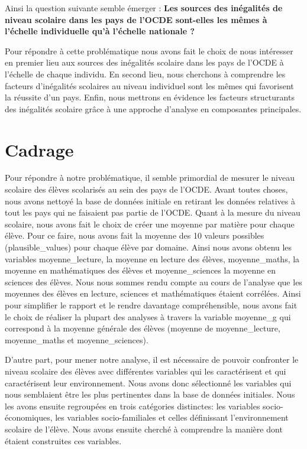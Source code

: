 \documentclass[
  french,
  11pt,
  a4paper,
]{report}
\begin{document}
Ainsi la question suivante semble émerger : \textbf{Les sources des
inégalités de niveau scolaire dans les pays de l'OCDE sont-elles les
mêmes à l'échelle individuelle qu'à l'échelle nationale ?}

Pour répondre à cette problématique nous avons fait le choix de nous
intéresser en premier lieu aux sources des inégalités scolaire dans les
pays de l'OCDE à l'échelle de chaque individu. En second lieu, nous
cherchons à comprendre les facteurs d'inégalités scolaires au niveau
individuel sont les mêmes qui favorisent la réussite d'un pays. Enfin,
nous mettrons en évidence les facteurs structurants des inégalités
scolaire grâce à une approche d'analyse en composantes principales.

\chapter{Cadrage}\label{cadrage}

Pour répondre à notre problématique, il semble primordial de mesurer le
niveau scolaire des élèves scolarisés au sein des pays de l'OCDE. Avant
toutes choses, nous avons nettoyé la base de données initiale en
retirant les données relatives à tout les pays qui ne faisaient pas
partie de l'OCDE. Quant à la mesure du niveau scolaire, nous avons fait
le choix de créer une moyenne par matière pour chaque élève. Pour ce
faire, nous avons fait la moyenne des 10 valeurs possibles
(plausible\_values) pour chaque élève par domaine. Ainsi nous avons
obtenu les variables moyenne\_lecture, la moyenne en lecture des élèves,
moyenne\_maths, la moyenne en mathématiques des élèves et
moyenne\_sciences la moyenne en sciences des élèves. Nous nous sommes
rendu compte au cours de l'analyse que les moyennes des élèves en
lecture, sciences et mathématiques étaient corrélées. Ainsi pour
simplifier le rapport et le rendre davantage compréhensible, nous avons
fait le choix de réaliser la plupart des analyses à travers la variable
moyenne\_g qui correspond à la moyenne générale des élèves (moyenne de
moyenne\_lecture, moyenne\_maths et moyenne\_sciences).

D'autre part, pour mener notre analyse, il est nécessaire de pouvoir
confronter le niveau scolaire des élèves avec différentes variables qui
les caractérisent et qui caractérisent leur environnement. Nous avons
donc sélectionné les variables qui nous semblaient être les plus
pertinentes dans la base de données initiales. Nous les avons ensuite
regroupées en trois catégories distinctes: les variables
socio-économiques, les variables socio-familiales et celles définissant
l'environnement scolaire de l'élève. Nous avons ensuite cherché à
comprendre la manière dont étaient construites ces variables.
\end{document}
